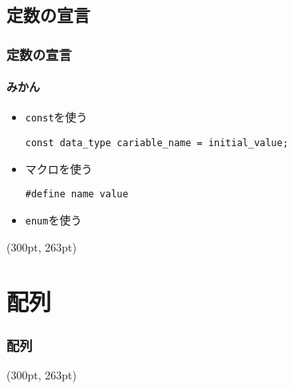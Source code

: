 \documentclass[dvipdfmx]{beamer}
\begin{document}
\subsection{定数の宣言}
\begin{frame}[c, fragile]
    \frametitle{定数の宣言}
    \framesubtitle{みかん}
    \begin{itemize}
        \item \texttt{const}を使う
            \begin{lstlisting}[gobble=16, caption=Syntax]
                const data_type cariable_name = initial_value;
            \end{lstlisting}
        \item マクロを使う
            \begin{lstlisting}[gobble=16, caption=Syntax]
                #define name value
            \end{lstlisting}
        \item \texttt{enum}を使う
    \end{itemize}
    \begin{textblock*}{0.3\linewidth}(300pt, 263pt)
    \space
    \end{textblock*}
\end{frame}

\section{配列}
\begin{frame}[t, fragile]
    \frametitle{配列}
    \tableofcontents[sections={2,10}]
    \begin{textblock*}{0.3\linewidth}(300pt, 263pt)
    \space
    \end{textblock*}
\end{frame}
\end{document}
